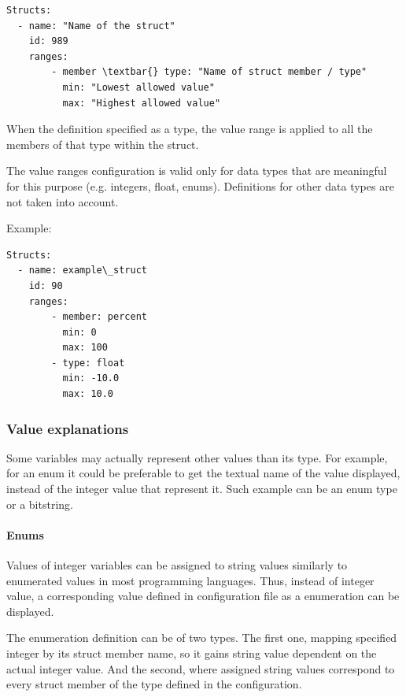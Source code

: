 \documentclass[A4paper,10pt,english]{sphinxmanual}
\begin{document}
\begin{Verbatim}[commandchars=\\\{\}]
Structs:
  - name: "Name of the struct"
    id: 989
    ranges:
        - member \textbar{} type: "Name of struct member / type"
          min: "Lowest allowed value"
          max: "Highest allowed value"
\end{Verbatim}

When the definition specified as a type, the value range is applied to all the members of that type within the struct.

The value ranges configuration is valid only for data types that are meaningful for this purpose (e.g. integers, float, enums). Definitions for other data types are not taken into account.

Example:

\begin{Verbatim}[commandchars=\\\{\}]
Structs:
  - name: example\_struct
    id: 90
    ranges:
        - member: percent
          min: 0
          max: 100
        - type: float
          min: -10.0
          max: 10.0
\end{Verbatim}


\subsubsection{Value explanations}
\label{user/config:value-explanations}
Some variables may actually represent other values than its type. For example, for an enum it could be preferable to get the textual name of the value displayed, instead of the integer value that represent it. Such example can be an enum type or a bitstring.


\paragraph{Enums}
\label{user/config:enums}
Values of integer variables can be assigned to string values similarly to enumerated values in most programming languages. Thus, instead of integer value, a corresponding value defined in configuration file as a enumeration can be displayed.

The enumeration definition can be of two types. The first one, mapping specified integer by its struct member name, so it gains string value dependent on the actual integer value. And the second, where assigned string values correspond to every struct member of the type defined in the configuration.
\end{document}
